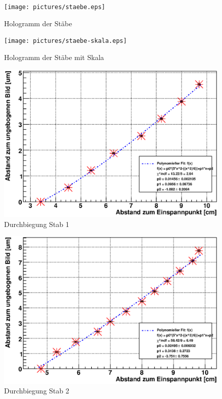 \documentclass[12pt]{article}
\begin{document}
\begin{figure}[h]
\centering
 \texttt{[image: pictures/staebe.eps]}
 \caption{Hologramm der Stäbe}
\end{figure}

\begin{figure}[h]
\centering
 \texttt{[image: pictures/staebe-skala.eps]}
 \caption{Hologramm der Stäbe mit Skala}
\end{figure}

\begin{figure}[H]
\centering
 \includegraphics[width=0.9\linewidth]{pictures/st1.eps}
 \caption{Durchbiegung Stab 1}
\end{figure}

\begin{figure}[H]
\centering
 \includegraphics[width=0.9\linewidth]{pictures/st2.eps}
 \caption{Durchbiegung Stab 2}
\end{figure}
\end{document}
